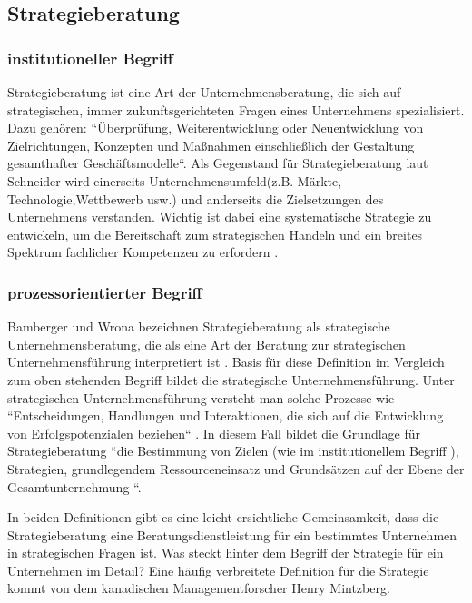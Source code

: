 \subsection{Strategieberatung}

\subsubsection{institutioneller Begriff}

 Strategieberatung ist eine Art der Unternehmensberatung, die sich auf strategischen, immer zukunftsgerichteten Fragen eines Unternehmens spezialisiert. Dazu gehören: ``Überprüfung, Weiterentwicklung oder Neuentwicklung von Zielrichtungen, Konzepten und Maßnahmen einschließlich der Gestaltung gesamthafter Geschäftsmodelle``\cite [424]{ReinekeBock200709}. Als Gegenstand für Strategieberatung laut Schneider wird einerseits Unternehmensumfeld(z.B. Märkte, Technologie,Wettbewerb usw.) und anderseits die Zielsetzungen des Unternehmens verstanden. Wichtig ist dabei eine systematische Strategie zu entwickeln, um die Bereitschaft zum strategischen Handeln und ein breites Spektrum fachlicher Kompetenzen zu erfordern \cite [424]{ReinekeBock200709}.

\subsubsection{prozessorientierter Begriff}

 Bamberger und Wrona bezeichnen Strategieberatung als strategische Unternehmensberatung, die als eine Art der Beratung zur strategischen Unternehmensführung interpretiert ist \cite[4]{BambergerWrona201205}. Basis für diese Definition im Vergleich zum oben stehenden Begriff bildet die strategische Unternehmensführung. Unter strategischen Unternehmensführung versteht man solche Prozesse wie ``Entscheidungen, Handlungen und Interaktionen, die sich auf die Entwicklung von Erfolgspotenzialen beziehen`` \cite[4]{BambergerWrona201205}.
 In diesem Fall bildet die Grundlage für Strategieberatung ``die Bestimmung von Zielen (wie im institutionellem Begriff ), Strategien, grundlegendem Ressourceneinsatz und Grundsätzen auf der Ebene der Gesamtunternehmung ``\cite[4]{BambergerWrona201205}.

In beiden Definitionen gibt es eine leicht ersichtliche  Gemeinsamkeit, dass die Strategieberatung eine Beratungsdienstleistung für ein bestimmtes Unternehmen in strategischen Fragen ist. 
Was steckt hinter dem Begriff der Strategie für ein Unternehmen im Detail? Eine häufig verbreitete Definition für die Strategie kommt von dem kanadischen Managementforscher Henry Mintzberg.


